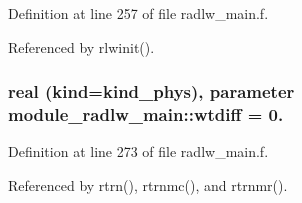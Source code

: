 Definition at line 257 of file radlw\+\_\+main.\+f.



Referenced by rlwinit().

\subsubsection[{\texorpdfstring{wtdiff}{wtdiff}}]{\setlength{\rightskip}{0pt plus 5cm}real (kind=kind\+\_\+phys), parameter module\+\_\+radlw\+\_\+main\+::wtdiff = 0.\hspace{0.3cm}{\ttfamily [private]}}\hypertarget{namespacemodule__radlw__main_af1a0ca36bfce779493a7d1a4b81f6f73}{}\label{namespacemodule__radlw__main_af1a0ca36bfce779493a7d1a4b81f6f73}


Definition at line 273 of file radlw\+\_\+main.\+f.



Referenced by rtrn(), rtrnmc(), and rtrnmr().

